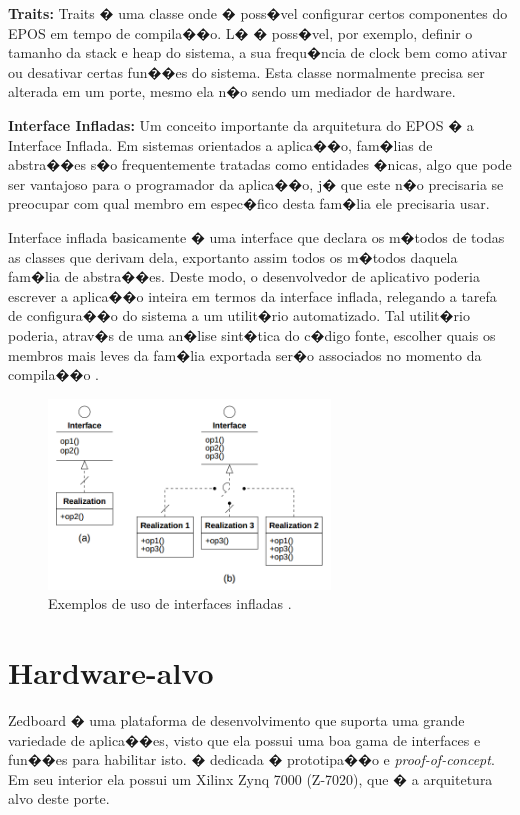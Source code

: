 \documentclass{ufscThesis/ufscThesis} %
\begin{document}
\textbf{Traits:} Traits � uma classe onde � poss�vel configurar certos componentes do EPOS em tempo de compila��o. L� � poss�vel, por exemplo, definir o tamanho da stack e heap do sistema, a sua frequ�ncia de clock bem como ativar ou desativar certas fun��es do sistema. Esta classe normalmente precisa ser alterada em um porte, mesmo ela n�o sendo um mediador de hardware.

\textbf{Interface Infladas: } Um conceito importante da arquitetura do EPOS � a Interface Inflada. %
Em sistemas orientados a aplica��o, fam�lias de abstra��es s�o frequentemente tratadas como entidades �nicas, algo que pode ser vantajoso para o programador da aplica��o, j� que este n�o precisaria se preocupar com qual membro em espec�fico desta fam�lia ele precisaria usar\cite{guto_thesis}.

Interface inflada basicamente � uma interface que declara os m�todos de todas as classes que derivam dela, exportanto assim todos os m�todos daquela fam�lia de abstra��es. Deste modo, o desenvolvedor de aplicativo poderia escrever a aplica��o inteira em termos da interface inflada, relegando a tarefa de configura��o do sistema a um utilit�rio automatizado. Tal utilit�rio poderia, atrav�s de uma an�lise sint�tica do c�digo fonte, escolher quais os membros mais leves da fam�lia exportada ser�o associados no momento da compila��o \cite[p.~56]{guto_thesis}.

\begin{figure}[ht!]
    \centering
    \includegraphics[width=7.5cm]{figuras/inflated_interface}
    \caption{Exemplos de uso de interfaces infladas \cite{guto_thesis}.}
\end{figure}


\section{Hardware-alvo}
Zedboard � uma plataforma de desenvolvimento que suporta uma grande variedade de aplica��es, visto que ela possui uma boa gama de interfaces e fun��es para habilitar isto. � dedicada � prototipa��o e \emph{proof-of-concept}. Em seu interior ela possui um Xilinx Zynq 7000 (Z-7020), que � a arquitetura alvo deste porte.
\end{document}
